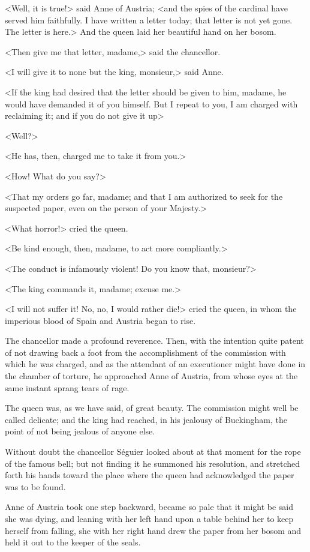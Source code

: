 <Well, it is true!> said Anne of Austria; <and the spies of the cardinal have served him faithfully. I have written a letter today; that letter is not yet gone. The letter is here.> And the queen laid her beautiful hand on her bosom. 

<Then give me that letter, madame,> said the chancellor. 

<I will give it to none but the king, monsieur,> said Anne. 

<If the king had desired that the letter should be given to him, madame, he would have demanded it of you himself. But I repeat to you, I am charged with reclaiming it; and if you do not give it up\longdash> 

<Well?> 

<He has, then, charged me to take it from you.> 

<How! What do you say?> 

<That my orders go far, madame; and that I am authorized to seek for the suspected paper, even on the person of your Majesty.> 

<What horror!> cried the queen. 

<Be kind enough, then, madame, to act more compliantly.> 

<The conduct is infamously violent! Do you know that, monsieur?> 

<The king commands it, madame; excuse me.> 

<I will not suffer it! No, no, I would rather die!> cried the queen, in whom the imperious blood of Spain and Austria began to rise. 

The chancellor made a profound reverence. Then, with the intention quite patent of not drawing back a foot from the accomplishment of the commission with which he was charged, and as the attendant of an executioner might have done in the chamber of torture, he approached Anne of Austria, from whose eyes at the same instant sprang tears of rage. 

The queen was, as we have said, of great beauty. The commission might well be called delicate; and the king had reached, in his jealousy of Buckingham, the point of not being jealous of anyone else. 

Without doubt the chancellor Séguier looked about at that moment for the rope of the famous bell; but not finding it he summoned his resolution, and stretched forth his hands toward the place where the queen had acknowledged the paper was to be found. 

Anne of Austria took one step backward, became so pale that it might be said she was dying, and leaning with her left hand upon a table behind her to keep herself from falling, she with her right hand drew the paper from her bosom and held it out to the keeper of the seals. 

